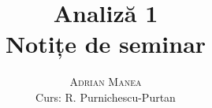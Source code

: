 \documentclass[12pt, a4paper]{book}
\begin{document}
\thispagestyle{empty}
\pagestyle{plain} %

\title{\huge\textbf{Analiză 1} \\ \Large{Notițe de seminar}}
\vspace{1cm}
\author{\Large\textsc{Adrian Manea} \\ \large{Curs: R. Purnichescu-Purtan}}

\maketitle

\tableofcontents

\setcounter{page}{1} %






\renewcommand{\indexname}{Index}
\printindex



\nocite{*}
\end{document}
